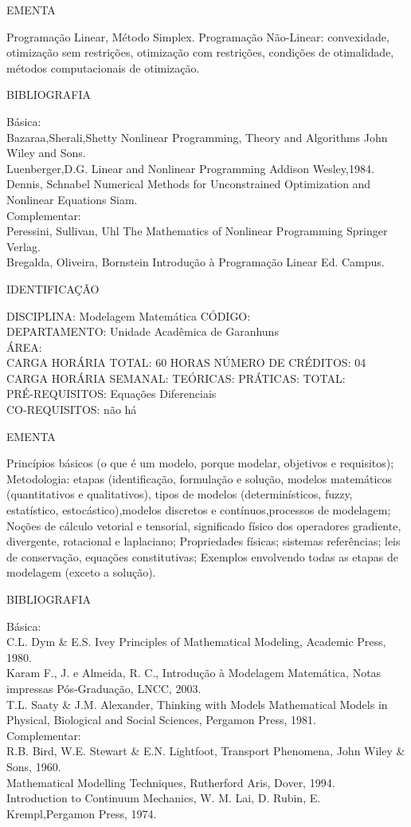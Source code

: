 \documentclass[
	12pt,				%
	openright,			%
  oneside,     %
	a4paper,			%
	chapter=TITLE,		%
	english,			%
	french,				%
	spanish,			%
	brazil				%
	]{abntex2}
\begin{document}
\begin{apendicesenv}
EMENTA 

Programação Linear, Método Simplex. Programação Não-Linear: convexidade,
otimização sem restrições, otimização com restrições, condições de
otimalidade, métodos computacionais de otimização.

BIBLIOGRAFIA 

Básica:\\
Bazaraa,Sherali,Shetty  Nonlinear Programming, Theory and Algorithms
 John Wiley and Sons.\\
Luenberger,D.G.  Linear and Nonlinear Programming  Addison
Wesley,1984.\\
Dennis, Schnabel  Numerical Methods for Unconstrained Optimization
and Nonlinear Equations Siam.\\
Complementar:\\
Peressini, Sullivan, Uhl The Mathematics of Nonlinear Programming 
Springer Verlag.\\
Bregalda, Oliveira, Bornstein  Introdução à Programação Linear  Ed.
Campus.

\newpage IDENTIFICAÇÃO

DISCIPLINA: Modelagem Matemática CÓDIGO:\\ 
DEPARTAMENTO: Unidade Acadêmica de Garanhuns\\ 
ÁREA: \\
CARGA HORÁRIA TOTAL: 60 HORAS NÚMERO DE CRÉDITOS: 04\\
CARGA HORÁRIA SEMANAL: TEÓRICAS: PRÁTICAS: TOTAL: \\
PRÉ-REQUISITOS: Equações Diferenciais\\
CO-REQUISITOS: não há

EMENTA 

Princípios básicos (o que é um modelo, porque modelar, objetivos e requisitos); Metodologia: etapas (identificação, formulação e solução, modelos matemáticos (quantitativos e qualitativos), tipos de modelos (determinísticos, fuzzy, estatístico, estocástico),modelos discretos e contínuos,processos de modelagem; Noções de cálculo vetorial e tensorial, significado físico dos operadores gradiente, divergente, rotacional e laplaciano; Propriedades físicas; sistemas referências; leis de conservação, equações constitutivas; Exemplos envolvendo todas as etapas de modelagem (exceto a solução). 

BIBLIOGRAFIA 

Básica: \\
C.L. Dym \& E.S. Ivey  Principles of Mathematical Modeling, Academic
Press, 1980.\\
Karam F., J. e Almeida, R. C., Introdução à Modelagem Matemática, Notas
impressas Pós-Graduação, LNCC, 2003.\\
T.L. Saaty \& J.M. Alexander, Thinking with Models  Mathematical
Models in Physical, Biological and Social Sciences, Pergamon Press, 1981.\\
Complementar:\\
R.B. Bird, W.E. Stewart \& E.N. Lightfoot, Transport Phenomena, John
Wiley \& Sons, 1960.\\
Mathematical Modelling Techniques, Rutherford Aris, Dover, 1994.\\
Introduction to Continuum Mechanics, W. M. Lai, D. Rubin, E.
Krempl,Pergamon Press, 1974.


\end{apendicesenv}
\end{document}
